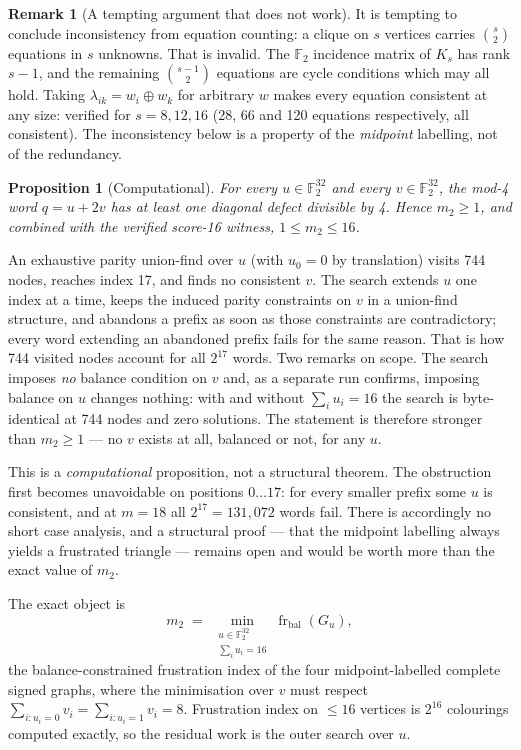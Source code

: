 \documentclass[11pt,a4paper,oneside]{report}
\newtheorem{proposition}[theorem]{Proposition}
\theoremstyle{definition}
\newtheorem{remark}[theorem]{Remark}
\newcommand{\F}{\mathbb{F}}
\begin{document}
\begin{remark}[A tempting argument that does not work]
It is tempting to conclude inconsistency from equation counting: a clique on $s$
vertices carries $\binom{s}{2}$ equations in $s$ unknowns. That is invalid. The
$\F_2$ incidence matrix of $K_s$ has rank $s-1$, and the remaining
$\binom{s-1}{2}$ equations are cycle conditions which may all hold. Taking
$\lambda_{ik}=w_i\oplus w_k$ for arbitrary $w$ makes every equation consistent at
any size: verified for $s=8,12,16$ (28, 66 and 120 equations respectively, all
consistent). The inconsistency below is a property of the \emph{midpoint}
labelling, not of the redundancy.
\end{remark}

\begin{proposition}[Computational]
\label{p7-prop:m2}
For every $u\in\F_2^{32}$ and every $v\in\F_2^{32}$, the mod-4 word $q=u+2v$ has
at least one diagonal defect divisible by 4. Hence $m_2\ge1$, and combined with
the verified score-16 witness, $1\le m_2\le16$.
\end{proposition}

An exhaustive parity union-find over $u$ (with $u_0=0$ by translation) visits 744 nodes, reaches index 17, and finds no consistent $v$. The search extends $u$ one index
at a time, keeps the induced parity constraints on $v$ in a union-find structure, and abandons a
prefix as soon as those constraints are contradictory; every word extending an abandoned prefix
fails for the same reason. That is how 744 visited nodes account for all $2^{17}$ words. Two remarks on scope. The
search imposes \emph{no} balance condition on $v$ and, as a separate run
confirms, imposing balance on $u$ changes nothing: with and without
$\sum_i u_i=16$ the search is byte-identical at 744 nodes and zero solutions. The
statement is therefore stronger than $m_2\ge1$ --- no $v$ exists at all, balanced
or not, for any $u$.

This is a \emph{computational} proposition, not a structural theorem. The
obstruction first becomes unavoidable on positions $0\ldots17$: for every
smaller prefix some $u$ is consistent, and at $m=18$ all $2^{17}=131{,}072$ words
fail. There is accordingly no short case analysis, and a structural proof --- that
the midpoint labelling always yields a frustrated triangle --- remains open and
would be worth more than the exact value of $m_2$.

The exact object is
\[
m_2 \;=\; \min_{\substack{u\in\F_2^{32}\\ \sum_i u_i=16}}
\operatorname{fr}_{\mathrm{bal}}(G_u),
\]
the balance-constrained frustration index of the four midpoint-labelled complete
signed graphs, where the minimisation over $v$ must respect
$\sum_{i:u_i=0}v_i=\sum_{i:u_i=1}v_i=8$. Frustration index on $\le16$ vertices is
$2^{16}$ colourings computed exactly, so the residual work is the outer search
over $u$.
\end{document}
